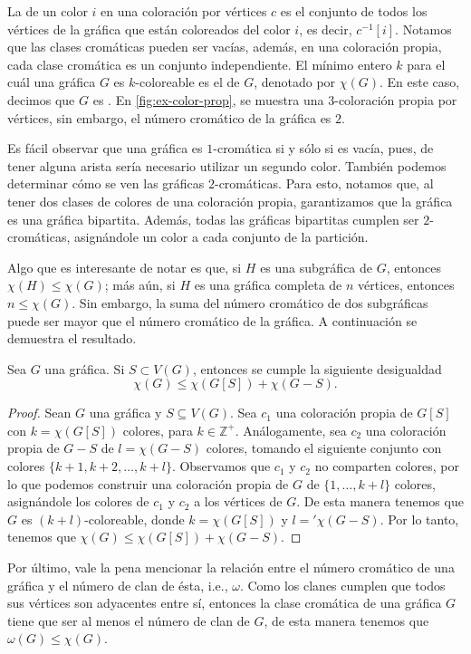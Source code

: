 \newpage

La  de un color $i$ en una coloraci\'on por v\'ertices
$c$ es el conjunto de todos los v\'ertices de la gr\'afica que est\'an
coloreados del color $i$, es decir, $c^{-1}[i]$. Notamos que las clases
crom\'aticas pueden ser vac\'ias, adem\'as, en una coloraci\'on propia, cada
clase crom\'atica es un conjunto independiente. El m\'inimo entero $k$ para el
cu\'al una gr\'afica $G$ es $k$-coloreable es el 
de $G$, denotado por $\chi(G)$. En este caso, decimos que $G$ es
. En \cref{fig:ex-color-prop}, se muestra
una $3$-coloraci\'on propia por v\'ertices, sin embargo, el n\'umero crom\'atico
de la gr\'afica es $2$. 

Es f\'acil observar que una gr\'afica es $1$-crom\'atica si y s\'olo si es
vac\'ia, pues, de tener alguna arista ser\'ia necesario utilizar un segundo
color. Tambi\'en podemos determinar c\'omo se ven las gr\'aficas
$2$-crom\'aticas. Para esto, notamos que, al tener dos clases de colores de una
coloraci\'on propia, garantizamos que la gr\'afica es una gr\'afica bipartita.
Adem\'as, todas las gr\'aficas bipartitas cumplen ser $2$-crom\'aticas,
asign\'andole un color a cada conjunto de la partici\'on.

Algo que es interesante de notar es que, si $H$ es una subgr\'afica de $G$,
entonces $\chi(H) \leq \chi(G)$; m\'as a\'un, si $H$ es una gr\'afica completa
de $n$ v\'ertices, entonces $n \leq \chi(G)$. Sin embargo, la suma del n\'umero
crom\'atico de dos subgr\'aficas puede ser mayor que el n\'umero crom\'atico de
la gr\'afica. A continuaci\'on se demuestra el resultado.

\begin{proposicion}
    Sea $G$ una gr\'afica.   Si $S \subset V(G)$, entonces se cumple la
    siguiente desigualdad
    \[
        \chi(G) \leq \chi(G[S])+\chi(G-S).
    \] 
\end{proposicion}

\begin{proof}
    Sean $G$ una gr\'afica y $S \subseteq V(G)$.  Sea $c_1$ una coloraci\'on
    propia de $G[S]$ con $ k= \chi(G[S])$ colores, para $k \in \mathbb{Z^+}$.
    An\'alogamente, sea $c_2$ una coloraci\'on propia de $G-S$ de $l= \chi(G-S)$
    colores, tomando el siguiente conjunto con colores $\{k+1, k+2, \dots,
    k+l\}$. Observamos que $c_1$ y $c_2$ no comparten colores, por lo que
    podemos construir una coloraci\'on propia de $G$ de $\{1, \dots, k+l\}$
    colores, asign\'andole los colores de $c_1$ y $c_2$ a los v\'ertices de $G$.
    De esta manera tenemos que $G$ es $(k+l)$-coloreable, donde $k = \chi(G[S])$
    y $l = '\chi(G-S)$. Por lo tanto, tenemos que $\chi(G) \leq
    \chi(G[S])+\chi(G-S)$.
\end{proof}

Por \'ultimo, vale la pena mencionar la relaci\'on entre el n\'umero crom\'atico
de una gr\'afica y el n\'umero de clan de \'esta, i.e., $\omega$. Como los
clanes cumplen que todos sus v\'ertices son adyacentes entre s\'i, entonces la
clase crom\'atica de una gr\'afica $G$ tiene que ser al menos el n\'umero de
clan de $G$, de esta manera tenemos que $\omega(G) \leq \chi(G)$.